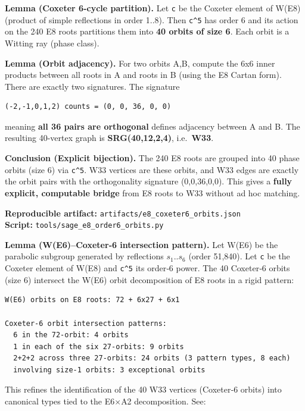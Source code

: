 \documentclass[11pt]{article}
\begin{document}
\textbf{Lemma (Coxeter 6-cycle partition).} Let \texttt{c} be the
Coxeter element of W(E8) (product of simple reflections in order 1..8).
Then \texttt{c\^{}5} has order 6 and its action on the 240 E8 roots
partitions them into \textbf{40 orbits of size 6}. Each orbit is a
Witting ray (phase class).

\textbf{Lemma (Orbit adjacency).} For two orbits A,B, compute the 6x6
inner products between all roots in A and roots in B (using the E8
Cartan form). There are exactly two signatures. The signature

\begin{verbatim}
(-2,-1,0,1,2) counts = (0, 0, 36, 0, 0)
\end{verbatim}

meaning \textbf{all 36 pairs are orthogonal} defines adjacency between A
and B. The resulting 40-vertex graph is \textbf{SRG(40,12,2,4)},
i.e.~\textbf{W33}.

\textbf{Conclusion (Explicit bijection).} The 240 E8 roots are grouped
into 40 phase orbits (size 6) via \texttt{c\^{}5}. W33 vertices are
these orbits, and W33 edges are exactly the orbit pairs with the
orthogonality signature (0,0,36,0,0). This gives a \textbf{fully
explicit, computable bridge} from E8 roots to W33 without ad hoc
matching.

\textbf{Reproducible artifact:}
\texttt{artifacts/e8\_coxeter6\_orbits.json}\\
\textbf{Script:} \texttt{tools/sage\_e8\_order6\_orbits.py}

\textbf{Lemma (W(E6)--Coxeter‑6 intersection pattern).} Let W(E6) be the
parabolic subgroup generated by reflections \(s_{1}\)..\(s_{6}\) (order
51,840). Let \texttt{c} be the Coxeter element of W(E8) and
\texttt{c\^{}5} its order‑6 power. The 40 Coxeter‑6 orbits (size 6)
intersect the W(E6) orbit decomposition of E8 roots in a rigid pattern:

\begin{verbatim}
W(E6) orbits on E8 roots: 72 + 6x27 + 6x1

Coxeter‑6 orbit intersection patterns:
  6 in the 72‑orbit: 4 orbits
  1 in each of the six 27‑orbits: 9 orbits
  2+2+2 across three 27‑orbits: 24 orbits (3 pattern types, 8 each)
  involving size‑1 orbits: 3 exceptional orbits
\end{verbatim}

This refines the identification of the 40 W33 vertices (Coxeter‑6
orbits) into canonical types tied to the E6\ensuremath{\times}A2
decomposition. See:
\end{document}
